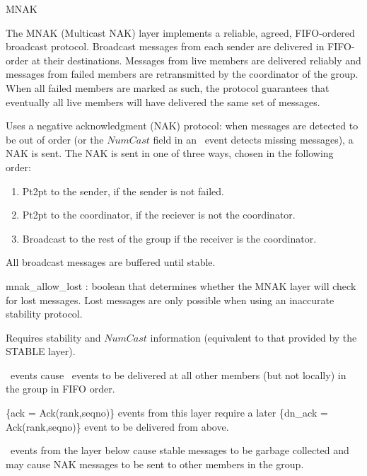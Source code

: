 %
%
%
\begin{Layer}{MNAK}

The MNAK (Multicast NAK) layer implements a reliable, agreed, FIFO-ordered
broadcast protocol.  Broadcast messages from each sender are delivered in
FIFO-order at their destinations.  Messages from live members are delivered
reliably and messages from failed members are retransmitted by the coordinator
of the group.  When all failed members are marked as such, the protocol
guarantees that eventually all live members will have delivered the same set of
messages.

\begin{Protocol}
Uses a negative acknowledgment (NAK) protocol: when messages are detected
to be out of order (or the $NumCast$ field in an \UpStable\ event detects
missing messages), a NAK is sent.  The NAK is sent in one of three ways,
chosen in the following order:
\begin{enumerate}
\item Pt2pt to the sender, if the sender is not failed.
\item Pt2pt to the coordinator, if the reciever is not the coordinator.
\item Broadcast to the rest of the group if the receiver is the
  coordinator.
\end{enumerate}
All broadcast messages are buffered until stable.
\end{Protocol}

\begin{Parameters}
\item mnak\_allow\_lost : boolean that determines whether the MNAK layer will
check for lost messages.  Lost messages are only possible when using an
inaccurate stability protocol.
\end{Parameters}

\begin{Properties}
\item
Requires stability and $NumCast$ information (equivalent to that provided
by the STABLE layer).
\item
\DnCast\ events cause \UpCast\ events to be delivered at all other members
(but not locally) in the group in FIFO order.
\item
\UpCast\{ack = Ack(rank,seqno)\} events from this layer require a later
\DnAck\{dn\_ack = Ack(rank,seqno)\} event to be delivered from above.
\item
\UpStable\ events from the layer below cause stable messages to be garbage
collected and may cause NAK messages to be sent to other members in the
group.
\end{Properties}


\end{Layer}
